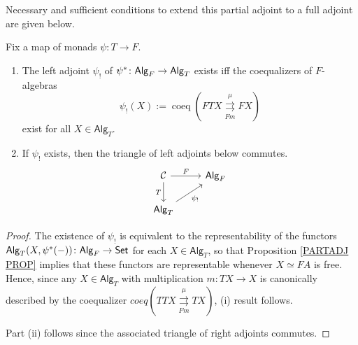 \documentclass[a4paper,10pt
,draft
]{article}%
\renewcommand{\1}{\eta}%
\newcommand{\Alg}{\mathsf{Alg}}
\begin{document}
Necessary and sufficient conditions to extend this partial adjoint to a full adjoint are given below.
\begin{corollary}
      \label{ALGLEFTEX_COR}
      Fix a map of monads $\psi \colon T \to F$.
      \begin{enumerate}[label = (\roman*)]
      \item The left adjoint $\psi_!$ of $\psi^{\**} \colon \Alg_F \to \Alg_T$ exists iff the coequalizers of $F$-algebras
            \[
                  \psi_!(X):= \mathop{coeq}\left( FTX \overset{\mu}{\underset{Fm}{\rightrightarrows}} FX \right)
            \]
            exist for all $X \in \mathsf{Alg}_T$.
      \item If $\psi_!$ exists, then the triangle of left adjoints below commutes.
            \[
                  \begin{tikzcd}
                        \mathcal C \arrow[d, "T"'] \arrow[r, "F"]
                        &
                        \mathsf{Alg}_F
                        \\
                        \mathsf{Alg}_T \arrow[ur, "{\psi_!}"']
                  \end{tikzcd}
            \]           
      \end{enumerate}
\end{corollary}
\begin{proof}
      The existence of $\psi_!$ is equivalent to the representability of the functors 
      $\Alg_T(X,\psi^{\**}(-))\colon \Alg_{F} \to \mathsf{Set}$
      for each $X \in \Alg_T$,
      so that Proposition \ref{PARTADJ PROP} implies that these functors are representable whenever $X \simeq FA$ is free.
      Hence, since any $X \in \Alg_T$
      with multiplication $m \colon TX \to X$
      is canonically described by the coequalizer %
      $coeq \left(
            T T X 
            \overset{\mu}{\underset{Fm}{\rightrightarrows}}
            T X
      \right)$,
      (i) result follows.

      Part (ii) follows since the associated triangle of right adjoints commutes.
\end{proof}


\end{document}

